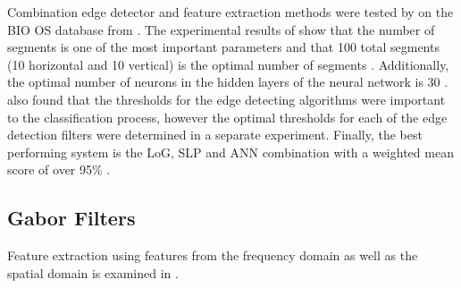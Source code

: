 Combination edge detector and feature extraction methods were tested by \cite{alazzawi2018performance} on the BIO OS database from \cite{bioid}. The experimental results of \cite{alazzawi2018performance} show that the number of segments is one of the most important parameters and that 100 total segments (10 horizontal and 10 vertical) is the optimal number of segments \cite{alazzawi2018performance}. Additionally, the optimal number of neurons in the hidden layers of the neural network is 30 \cite{alazzawi2018performance}. \cite{alazzawi2018performance} also found that the thresholds for the edge detecting algorithms were important to the classification process, however the optimal thresholds for each of the edge detection filters were determined in a separate experiment. Finally, the best performing system is the LoG, SLP and ANN combination with a weighted mean score of over 95\% \cite{alazzawi2018performance}.

%








\subsection{Gabor Filters}
Feature extraction using features from the frequency domain as well as the spatial domain is examined in \cite{lajevardi2012automatic}. 

